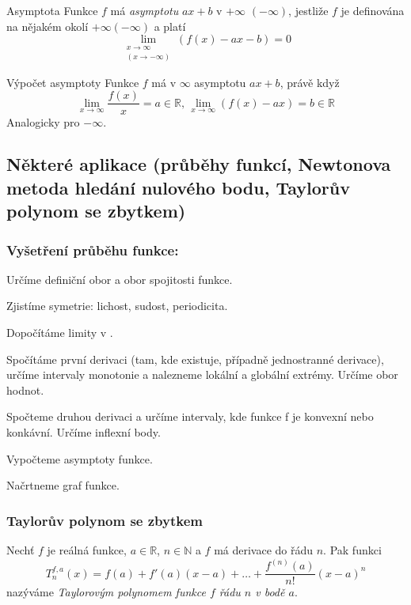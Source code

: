 \begin{definiceN}{Asymptota}
Funkce $f$ má \textit{asymptotu} $ax+b$ v $+\infty$ $(-\infty)$, jestliže $f$ je definována na nějakém okolí $+\infty (- \infty)$ a platí
$$\lim_{\substack{x \rightarrow \infty \\ (x \rightarrow -\infty)}} (f(x)-ax-b)=0$$
\end{definiceN}

\begin{vetaN}{Výpočet asymptoty}
Funkce $f$ má v $\infty$ asymptotu $ax+b$, právě když $$\lim_{x \rightarrow \infty}\frac{f(x)}{x}=a \in \mathbb{R},\,\lim_{x \rightarrow \infty}(f(x)-ax)=b \in \mathbb{R}$$
Analogicky pro $- \infty$.
\end{vetaN}

\subsection{Některé aplikace (průběhy funkcí, Newtonova metoda hledání nulového bodu, Taylorův polynom se zbytkem)}

\subsubsection*{Vyšetření průběhu funkce:}
\begin{penumerate}
	\item Určíme definiční obor a obor spojitosti funkce.
	\item Zjistíme symetrie: lichost, sudost, periodicita.
	\item Dopočítáme limity v .
	\item Spočítáme první derivaci (tam, kde existuje, případně jednostranné derivace), určíme intervaly monotonie a nalezneme lokální a globální extrémy. Určíme obor hodnot.
	\item Spočteme druhou derivaci a určíme intervaly, kde funkce f je konvexní nebo konkávní. Určíme inflexní body.
	\item Vypočteme asymptoty funkce.
	\item Načrtneme graf funkce.
\end{penumerate}

\subsubsection*{Taylorův polynom se zbytkem}

\begin{definice}
Nechť $f$ je reálná funkce, $a \in \mathbb{R}$, $n \in \mathbb{N}$ a $f$ má derivace do řádu $n$. Pak funkci
$$T^{f,a}_n(x)=f(a) + f'(a)(x-a) + \dots + \frac{f^{(n)}(a)}{n!}(x-a)^n$$
nazýváme \emph{Taylorovým polynomem funkce $f$ řádu $n$ v bodě $a$}.
\end{definice}

